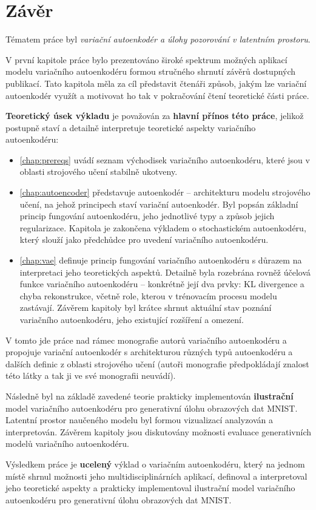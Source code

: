 \chapter*{Závěr}

Tématem práce byl \emph{variační autoenkodér a úlohy pozorování v latentním prostoru}.

V první kapitole práce bylo prezentováno široké spektrum možných aplikací modelu variačního autoenkodéru formou stručného shrnutí závěrů dostupných publikací.
Tato kapitola měla za cíl představit čtenáři způsob, jakým lze variační autoenkodér využít a motivovat ho tak v pokračování čtení teoretické části práce.

\textbf{Teoretický úsek výkladu} je považován za \textbf{hlavní přínos této práce}, jelikož postupně staví a detailně interpretuje teoretické aspekty variačního autoenkodéru:
\begin{itemize}
    \item \autoref{chap:prereqs} uvádí seznam východisek variačního autoenkodéru, které jsou v oblasti strojového učení stabilně ukotveny.
    \item \autoref{chap:autoencoder} představuje autoenkodér – architekturu modelu strojového učení, na jehož principech staví variační autoenkodér. Byl popsán základní princip fungování autoenkodéru, jeho jednotlivé typy a způsob jejich regularizace. Kapitola je zakončena výkladem o stochastickém autoenkodéru, který slouží jako předchůdce pro uvedení variačního autoenkodéru. 
    \item \autoref{chap:vae} definuje princip fungování variačního autoenkodéru s důrazem na interpretaci jeho teoretických aspektů. Detailně byla rozebrána rovněž účelová funkce variačního autoenkodéru – konkrétně její dva prvky: KL divergence a chyba rekonstrukce, včetně role, kterou v trénovacím procesu modelu zastávají. Závěrem kapitoly byl krátce shrnut aktuální stav poznání variačního autoenkodéru, jeho existující rozšíření a omezení.
\end{itemize}

V tomto jde práce nad rámec monografie autorů variačního autoenkodéru \textcite{Kingma2019} a propojuje variační autoenkodér s architekturou různých typů autoenkodéru a dalších definic z oblasti strojového učení (autoři monografie předpokládají znalost této látky a tak ji ve své monografii neuvádí).

Následně byl na základě zavedené teorie prakticky implementován \textbf{ilustrační} model variačního autoenkodéru pro generativní úlohu obrazových dat MNIST.
Latentní prostor naučeného modelu byl formou vizualizací analyzován a interpretován. Závěrem kapitoly jsou diskutovány možnosti evaluace generativních modelů variačního autoenkodéru.

Výsledkem práce je \textbf{ucelený} výklad o variačním autoenkodéru, který na jednom místě shrnul možnosti jeho multidisciplinárních aplikací, definoval a interpretoval jeho teoretické aspekty a prakticky implementoval ilustrační model variačního autoenkodéru pro generativní úlohu obrazových dat MNIST.